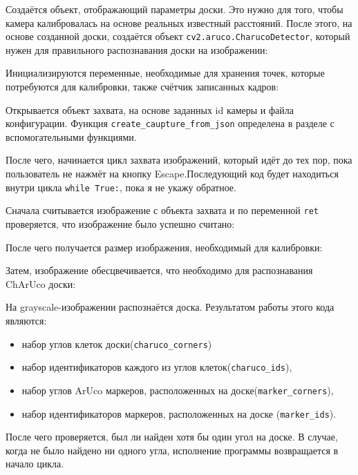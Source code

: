 \documentclass[14pt, a4paper]{extarticle}
\begin{document}
Создаётся объект, отображающий параметры доски. Это нужно для того, чтобы
камера калибровалась на основе реальных известный расстояний. После этого, на основе
созданной доски, создаётся объект \texttt{cv2.aruco.CharucoDetector}, который
нужен для правильного распознавания доски на изображении:

Инициализируются переменные, необходимые для хранения точек, которые потребуются
для калибровки, также счётчик записанных кадров:

Открывается объект захвата, на основе заданных id камеры и файла конфигурации.
Функция \texttt{create\_caupture\_from\_json} определена в разделе с
вспомогательными функциями.

После чего, начинается цикл захвата изображений, который идёт до тех пор, пока
пользователь не нажмёт на кнопку Escape.Последующий код будет
находиться внутри цикла \texttt{while True:}, пока я не укажу обратное.
\par
Сначала считывается изображение с объекта захвата и по переменной
\texttt{ret} проверяется, что изображение было успешно считано:

После чего получается размер изображения, необходимый для калибровки:

Затем, изображение обесцвечивается, что необходимо для распознавания ChArUco доски:

На grayscale-изображении распознаётся доска. Результатом работы этого кода
являются: 
\begin{itemize}
  \item набор углов клеток доски(\texttt{charuco\_corners})
  \item набор идентификаторов каждого из углов клеток(\texttt{charuco\_ids}),
  \item набор углов ArUco маркеров, расположенных на доске(\texttt{marker\_corners}),
  \item набор идентификаторов маркеров, расположенных на доске (\texttt{marker\_ids}).
\end{itemize}
После чего проверяется, был ли найден хотя бы один угол на доске.
В случае, когда не было найдено ни одного угла, исполнение программы
возвращается в начало цикла.
\end{document}
